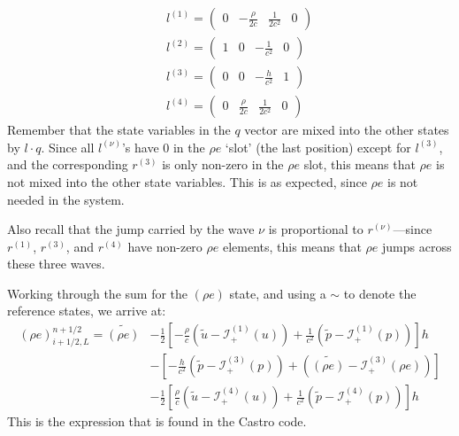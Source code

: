 \begin{eqnarray}
&&
l^{(1)} = ( \begin{array}{cccc} 0 & -\frac{\rho}{2c} & \frac{1}{2c^2} & 0
            \end{array} ) \nonumber \\
&&
l^{(2)} = ( \begin{array}{cccc} 1 & 0 & -\frac{1}{c^2} & 0
            \end{array} ) \nonumber \\
&&
l^{(3)} = ( \begin{array}{cccc} 0 & 0 & -\frac{h}{c^2} & 1
            \end{array} ) \nonumber \\
&&
l^{(4)} = ( \begin{array}{cccc} 0 & \frac{\rho}{2c} & \frac{1}{2c^2} & 0
            \end{array} )
\end{eqnarray}
Remember that the state variables in the $q$ vector are mixed into the
other states by $l \cdot q$.  Since all $l^{(\nu)}$'s have $0$ in the
$\rho e$ `slot' (the last position) except for $l^{(3)}$, and the
corresponding $r^{(3)}$ is only non-zero in the $\rho e$ slot, this
means that $\rho e$ is not mixed into the other state variables.  This
is as expected, since $\rho e$ is not needed in the system.

Also recall that the jump carried by the wave $\nu$ is proportional
to $r^{(\nu)}$---since $r^{(1)}$, $r^{(3)}$, and $r^{(4)}$ have
non-zero $\rho e$ elements, this means that $\rho e$ jumps across
these three waves.

Working through the sum for the $(\rho e)$ state, and using a $\sim$ to
denote the reference states, we arrive at:
\begin{align}
(\rho e)_{i+1/2,L}^{n+1/2} = \widetilde{(\rho e)} &-
   \frac{1}{2} \left [ -\frac{\rho}{c} \left (\tilde{u} - \mathcal{I}^{(1)}_+(u) \right )
                       +\frac{1}{c^2} \left (\tilde{p} - \mathcal{I}^{(1)}_+(p) \right )
               \right ] h \nonumber \\
  &-
    \left [ -\frac{h}{c^2} \left (\tilde{p} - \mathcal{I}^{(3)}_+(p) \right )
                       + \left (\widetilde{(\rho e)} - \mathcal{I}^{(3)}_+(\rho e) \right )
               \right ] \nonumber \\
  &-
   \frac{1}{2} \left [ \frac{\rho}{c} \left (\tilde{u} - \mathcal{I}^{(4)}_+(u) \right )
                       +\frac{1}{c^2} \left (\tilde{p} - \mathcal{I}^{(4)}_+(p) \right )
               \right ] h
\end{align}
This is the expression that is found in the Castro code.


